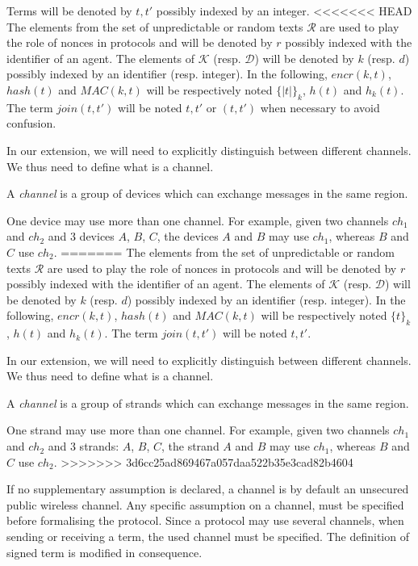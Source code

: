 Terms will be denoted by $t, t'$ possibly indexed by an integer. 
<<<<<<< HEAD
The elements from the set of unpredictable or random texts $\mathcal{R}$ are used to play the role of nonces in protocols and will be denoted by $r$ possibly indexed with the identifier of an agent. The elements of $\mathcal{K}$ (resp. $\mathcal{D}$) will be denoted by $k$ (resp. $d$) possibly indexed by an identifier (resp. integer). In the following, $encr(k,t)$, $hash(t)$ and $MAC(k,t)$ will be respectively noted ${\{|t|\}}_k$, $h(t)$ and $h_k(t)$. The term $join(t,t')$ will be noted $t,t'$ or $(t,t')$ when necessary to avoid confusion. 

In our extension, we will need to explicitly distinguish between different channels. We thus need to define what is a channel.

\begin{Definition}[Channel] A \emph{channel} is a group of devices which can exchange messages in the same region.
\end{Definition} 

One device may use more than one channel.
For example, given two channels $ch_1$ and $ch_2$ and 3 devices $A$, $B$, $C$, the devices $A$ and $B$ may use $ch_1$, whereas $B$ and $C$ use $ch_2$. 
=======
The elements from the set of unpredictable or random texts $\mathcal{R}$ are used to play the role of nonces in protocols and will be denoted by $r$ possibly indexed with the identifier of an agent. The elements of $\mathcal{K}$ (resp. $\mathcal{D}$) will be denoted by $k$ (resp. $d$) possibly indexed by an identifier (resp. integer). In the following, $encr(k,t)$, $hash(t)$ and $MAC(k,t)$ will be respectively noted ${\{t\}}_k$, $h(t)$ and $h_k(t)$. The term $join(t,t')$ will be noted $t,t'$. 

In our extension, we will need to explicitly distinguish between different channels. We thus need to define what is a channel.

\begin{Definition}[Channel] A \emph{channel} is a group of strands which can exchange messages in the same region.
\end{Definition} 

One strand may use more than one channel.
For example, given two channels $ch_1$ and $ch_2$ and 3 strands: $A$, $B$, $C$, the strand $A$ and $B$ may use $ch_1$, whereas $B$ and $C$ use $ch_2$. 
>>>>>>> 3d6cc25ad869467a057daa522b35e3cad82b4604

If no supplementary assumption is declared, a channel is by default an unsecured public wireless channel. Any specific assumption on a channel, must be specified before formalising the protocol. Since a protocol may use several channels, when sending or receiving a term, the used channel must be specified. The definition of signed term is modified in consequence. 

